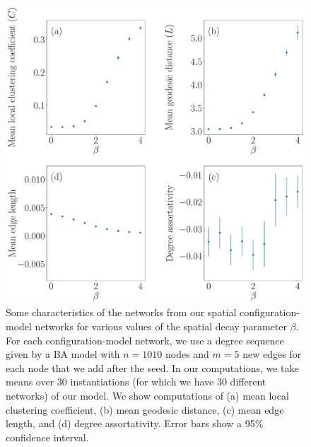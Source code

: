 \documentclass[%
 reprint,
 amsmath,amssymb,
 aps,
]{revtex4-1}
\begin{document}
\begin{figure}
    \centering
    \includegraphics[width=1.0\linewidth]{spatial_configuration_metrics3.pdf}
    \caption{Some characteristics of the networks from our spatial configuration-model networks for various values of the spatial decay parameter $\beta$. For each configuration-model network, we use a degree sequence given by a BA model with $n=1010$ nodes and $m=5$ new edges for each node that we add after the seed. In our computations, we take means 
    over $30$ instantiations (for which we have 30 different networks) of our model.
     We show computations of (a) mean local clustering coefficient, (b) mean geodesic distance, (c) mean edge length, and (d) degree assortativity. Error bars show a 95\% confidence interval.
    }
    \label{fig:spatial_configuration_metrics}
\end{figure}
\end{document}

